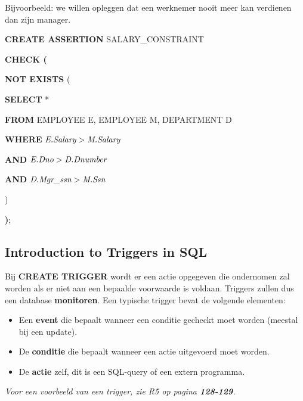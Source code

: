 Bijvoorbeeld: we willen opleggen dat een werknemer nooit meer kan verdienen dan zijn manager.

\vspace{1mm}\hspace{10mm}
\textbf{CREATE ASSERTION} SALARY\_CONSTRAINT

\hspace{10mm}
\textbf{CHECK (}

\hspace{20mm}
\textbf{NOT EXISTS} (

\hspace{45mm}
\textbf{SELECT} *

\hspace{45mm}
\textbf{FROM} EMPLOYEE E, EMPLOYEE M, DEPARTMENT D

\hspace{45mm}
\textbf{WHERE} $\textit{E.\textit{Salary}} > \textit{M.\textit{Salary}}$

\hspace{45mm}
 \textbf{AND} $\textit{E.\textit{Dno}} > \textit{D.\textit{Dnumber}}$

\hspace{45mm}
 \textbf{AND} $\textit{D.\textit{Mgr\_ssn}} > \textit{M.\textit{Ssn}}$

\hspace{20mm}
 )

\hspace{10mm}
 \textbf{)};


\subsection{Introduction to Triggers in SQL}
Bij \textbf{CREATE TRIGGER} wordt er een actie opgegeven die ondernomen zal worden als er niet aan een bepaalde voorwaarde is voldaan. Triggers zullen dus een database \textbf{monitoren}. Een typische trigger bevat de volgende elementen:
\begin{itemize}
\item Een \textbf{event} die bepaalt wanneer een conditie gecheckt moet worden (meestal bij een update).
\item De \textbf{conditie} die bepaalt wanneer een actie uitgevoerd moet worden.
\item De \textbf{actie} zelf, dit is een SQL-query of een extern programma.
\end{itemize}
\textit{Voor een voorbeeld van een trigger, zie R5 op pagina \textbf{128-129}.}


